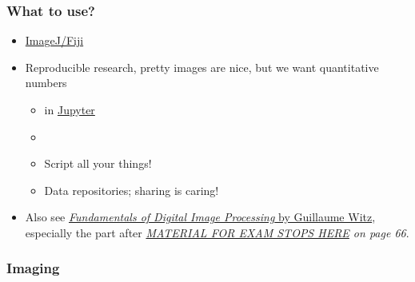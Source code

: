 \begin{frame}
  \frametitle{What to use?}
  \begin{itemize}
    \item \href{http://fiji.sc/}{ImageJ/Fiji}~\cite{Schindelin2012}
    \item Reproducible research, \ie{} pretty images are nice, but we want quantitative numbers
      \begin{itemize}
        \item \href{https://www.python.org/}{\faPython} in \href{https://jupyter.org/}{Jupyter}~\cite{Kluyver2016}
        \item \href{https://git-scm.com/}{\faGit}
        \item Script all your things!
        \item Data repositories; \ie{} sharing is caring!
      \end{itemize}
    \item Also see \href{https://ilias.unibe.ch/go/sess/3400760}{\emph{Fundamentals of Digital Image Processing} by Guillaume Witz}, especially the part after \emph{\href{https://docs.google.com/presentation/d/1JaYfH2rMMTRIhhS0tz5vR6odeh0UJ-qWRw1mebEH7c0/edit?slide=id.g38af0c6e582_0_0\#slide=id.g38af0c6e582_0_0}{MATERIAL FOR EXAM STOPS HERE} on page 66}.
  \end{itemize}
\end{frame}

\begin{frame}
  \frametitle{Imaging}
  \centering
\end{frame}
\renewcommand{\imageheight}{0.72\paperheight}%

